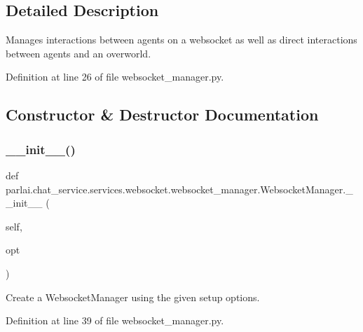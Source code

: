 \subsection{Detailed Description}
\begin{DoxyVerb}Manages interactions between agents on a websocket as well as direct interactions
between agents and an overworld.
\end{DoxyVerb}
 

Definition at line 26 of file websocket\+\_\+manager.\+py.



\subsection{Constructor \& Destructor Documentation}
\mbox{\label{classparlai_1_1chat__service_1_1services_1_1websocket_1_1websocket__manager_1_1WebsocketManager_ae44392cd364b3041420877e4f281261e}} 
\subsubsection{\texorpdfstring{\+\_\+\+\_\+init\+\_\+\+\_\+()}{\_\_init\_\_()}}
{\footnotesize\ttfamily def parlai.\+chat\+\_\+service.\+services.\+websocket.\+websocket\+\_\+manager.\+Websocket\+Manager.\+\_\+\+\_\+init\+\_\+\+\_\+ (\begin{DoxyParamCaption}\item[{}]{self,  }\item[{}]{opt }\end{DoxyParamCaption})}

\begin{DoxyVerb}Create a WebsocketManager using the given setup options.
\end{DoxyVerb}
 

Definition at line 39 of file websocket\+\_\+manager.\+py.


